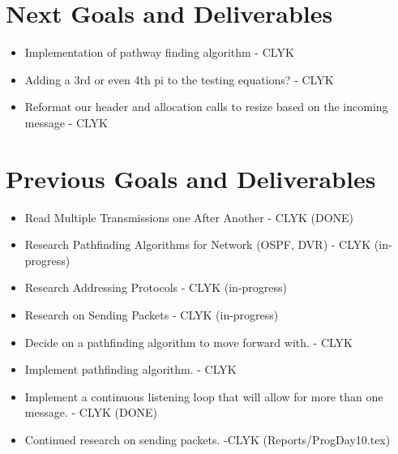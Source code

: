 \documentclass{article}
\begin{document}
\section*{Next Goals and Deliverables}
\begin{itemize}
\item Implementation of pathway finding algorithm - CLYK
\item Adding a 3rd or even 4th pi to the testing equations? - CLYK
\item Reformat our header and allocation calls to resize based on the incoming message - CLYK

\end{itemize}
\section*{Previous Goals and Deliverables}
\begin{itemize}
\item Read Multiple Transmissions one After Another - CLYK (DONE)
\item Research Pathfinding Algorithms for Network (OSPF, DVR) - CLYK (in-progress)
\item Research Addressing Protocols - CLYK (in-progress)
\item Research on Sending Packets - CLYK (in-progress)
\item Decide on a pathfinding algorithm to move forward with. - CLYK
\item Implement pathfinding algorithm. - CLYK
\item Implement a continuous listening loop that will allow for more than one message. - CLYK (DONE)
\item Continued research on sending packets. -CLYK (Reports/ProgDay10.tex)
\end{itemize}
\end{document}
